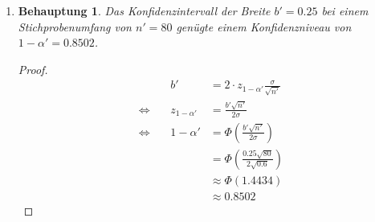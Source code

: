\documentclass[a4paper]{scrartcl}
\newtheorem*{behaupt}{Behauptung}
\newcommand{\gdw}{\Leftrightarrow}
\def \blattnr {8}
\begin{document}
\begin{enumerate}[label=\bfseries \blattnr.\arabic*]
\begin{enumerate}
            \item 
                \begin{behaupt}
                    Das Konfidenzintervall der Breite $b' = \num{0,25}$ bei
                    einem Stichprobenumfang von $n' = 80$ genügte einem
                    Konfidenzniveau von $1 - \alpha' = \num{0,8502}$.
                \end{behaupt}
                \begin{proof}
                    \begin{equation*}
                        \begin{alignedat}{2}
                            && b' &= 2 \cdot z_{1-\alpha'}
                            \frac{\sigma}{\sqrt{n'}} \\
                            \gdw\ && z_{1-\alpha'}
                            &= \frac{b' \sqrt{n'}}{2 \sigma} \\
                            \gdw\ && 1-\alpha'
                            &= \Phi \left( \frac{b' \sqrt{n'}}{2 \sigma}
                            \right) \\
                            &&&= \Phi \left( \frac{\num{0,25} \sqrt{80}}
                            {2 \sqrt{\num{0,6}}} \right) \\
                            &&&\approx \Phi \left( \num{1,4434} \right) \\
                            &&&\approx \num{0,8502}
                        \end{alignedat}
                    \end{equation*}
                \end{proof}
        \end{enumerate}


\end{enumerate}
\end{document}
